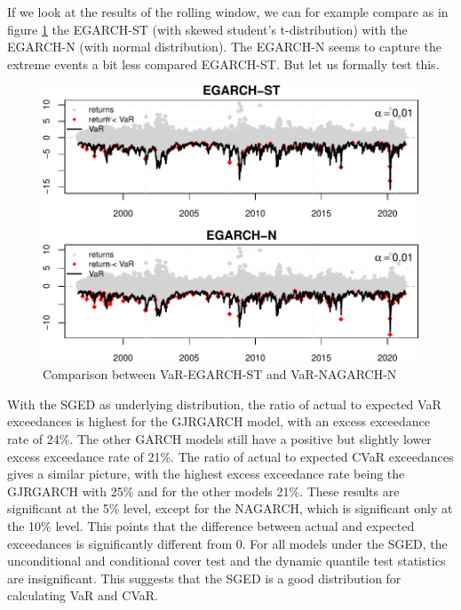 \documentclass[a4paper, twoside]{templates/ociamthesis}
\begin{document}
\noindent If we look at the results of the rolling window, we can for example compare as in figure \ref{fig:figurebacktests2} the EGARCH-ST (with skewed student's t-distribution) with the EGARCH-N (with normal distribution). The EGARCH-N seems to capture the extreme events a bit less compared EGARCH-ST. But let us formally test this.~\\

\newpage

\begin{figure}[h]

{\centering \includegraphics[width=0.9\linewidth]{_main_files/figure-latex/figurebacktests2-1} 

}

\caption{Comparison between VaR-EGARCH-ST and VaR-NAGARCH-N}\label{fig:figurebacktests2}
\end{figure}

With the SGED as underlying distribution, the ratio of actual to expected VaR exceedances is highest for the GJRGARCH model, with an excess exceedance rate of 24\%. The other GARCH models still have a positive but slightly lower excess exceedance rate of 21\%. The ratio of actual to expected CVaR exceedances gives a similar picture, with the highest excess exceedance rate being the GJRGARCH with 25\% and for the other models 21\%. These results are significant at the 5\% level, except for the NAGARCH, which is significant only at the 10\% level. This points that the difference between actual and expected exceedances is significantly different from 0. For all models under the SGED, the unconditional and conditional cover test and the dynamic quantile test statistics are insignificant. This suggests that the SGED is a good distribution for calculating VaR and CVaR.
\end{document}
